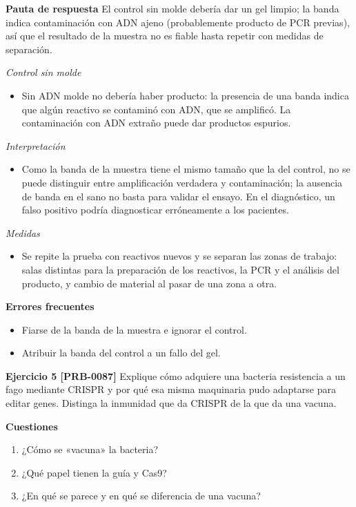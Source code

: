 \documentclass{book}
\begin{document}
\noindent\textbf{Pauta de respuesta}
El control sin molde debería dar un gel limpio; la banda indica contaminación con ADN ajeno (probablemente producto de PCR previas), así que el resultado de la muestra no es fiable hasta repetir con medidas de separación.


\noindent\textit{Control sin molde}
\begin{itemize}
\item Sin ADN molde no debería haber producto: la presencia de una banda indica que algún reactivo se contaminó con ADN, que se amplificó. La contaminación con ADN extraño puede dar productos espurios.
\end{itemize}

\noindent\textit{Interpretación}
\begin{itemize}
\item Como la banda de la muestra tiene el mismo tamaño que la del control, no se puede distinguir entre amplificación verdadera y contaminación; la ausencia de banda en el sano no basta para validar el ensayo. En el diagnóstico, un falso positivo podría diagnosticar erróneamente a los pacientes.
\end{itemize}

\noindent\textit{Medidas}
\begin{itemize}
\item Se repite la prueba con reactivos nuevos y se separan las zonas de trabajo: salas distintas para la preparación de los reactivos, la PCR y el análisis del producto, y cambio de material al pasar de una zona a otra.
\end{itemize}

\noindent\textbf{Errores frecuentes}
\begin{itemize}
\item Fiarse de la banda de la muestra e ignorar el control.
\item Atribuir la banda del control a un fallo del gel.
\end{itemize}

\noindent\textbf{Ejercicio 5 [PRB-0087]}
Explique cómo adquiere una bacteria resistencia a un fago mediante CRISPR y por qué esa misma maquinaria pudo adaptarse para editar genes. Distinga la inmunidad que da CRISPR de la que da una vacuna.


\noindent\textbf{Cuestiones}
\begin{enumerate}
\item ¿Cómo se «vacuna» la bacteria?
\item ¿Qué papel tienen la guía y Cas9?
\item ¿En qué se parece y en qué se diferencia de una vacuna?
\end{enumerate}
\end{document}
